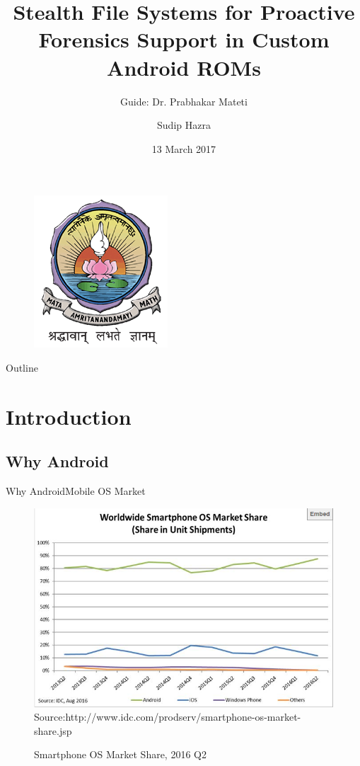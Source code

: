 \documentclass{beamer}
\title{Stealth File Systems for Proactive Forensics Support in Custom Android ROMs}
\author{Guide: Dr. Prabhakar Mateti\inst{1} \and Sudip Hazra\inst{2}}
\institute[Universities of Somewhere and Elsewhere] %
{
  \inst{1}%
  Wright State University
  \and
  \inst{2}%
  Amrita Centre For Cyber Security Systems and Networks\\
 Amrita University}
\date{13 March 2017}
\begin{document}
\begin{frame}
  \titlepage
  \centering
 
  \begin{figure}
  \centering
 \vspace{-.5cm}
  \includegraphics[width=.3\textwidth,height=.3\textheight]{images/AVV_colour}
  
  \end{figure}
  
 
\end{frame}

\begin{frame}{Outline}
  
  \begin{multicols}{3}
    \tableofcontents
  \end{multicols}
  
\end{frame}

\section{Introduction}

\subsection{Why Android}
\begin{frame}{Why Android}{Mobile OS Market}
\begin{figure}
\centering
\caption{Smartphone OS Market Share, 2016 Q2
}
\includegraphics[width=.6\textwidth,height=.5\textheight]{images/idc}
\label{imageLabel}
 \scriptsize{Source:http://www.idc.com/prodserv/smartphone-os-market-share.jsp}
\end{figure}

  
\end{frame}
\end{document}
